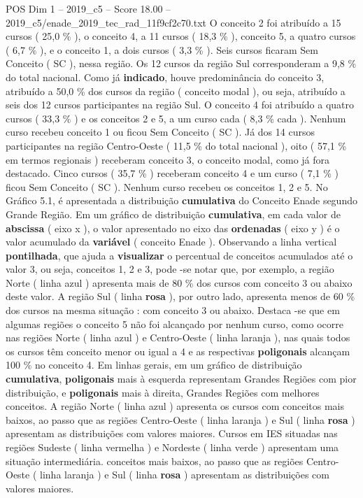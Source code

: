 \begin{textsample}{POS Dim 1 – 2019\_c5 – Score 18.00 – 2019\_c5/enade\_2019\_tec\_rad\_11f9cf2c70.txt}
O conceito 2 foi atribuído a 15 cursos ( 25,0 \% ), o conceito 4, a 11 cursos ( 18,3 \% ), conceito 5, a quatro cursos ( 6,7 \% ), e o conceito 1, a dois cursos ( 3,3 \% ).
Seis cursos ficaram Sem Conceito ( SC ), nessa região.
Os 12 cursos da região Sul corresponderam a 9,8 \% do total nacional.
Como já \textbf{indicado}, houve predominância do conceito 3, atribuído a 50,0 \% dos cursos da região ( conceito modal ), ou seja, atribuído a seis dos 12 cursos participantes na região Sul.
O conceito 4 foi atribuído a quatro cursos ( 33,3 \% ) e os conceitos 2 e 5, a um curso cada ( 8,3 \% cada ).
Nenhum curso recebeu conceito 1 ou ficou Sem Conceito ( SC ).
Já dos 14 cursos participantes na região Centro-Oeste ( 11,5 \% do total nacional ), oito ( 57,1 \% em termos regionais ) receberam conceito 3, o conceito modal, como já fora destacado.
Cinco cursos ( 35,7 \% ) receberam conceito 4 e um curso ( 7,1 \% ) ficou Sem Conceito ( SC ).
Nenhum curso recebeu os conceitos 1, 2 e 5.
No Gráfico 5.1, é apresentada a distribuição \textbf{cumulativa} do Conceito Enade segundo Grande Região.
Em um gráfico de distribuição \textbf{cumulativa}, em cada valor de \textbf{abscissa} ( eixo x ), o valor apresentado no eixo das \textbf{ordenadas} ( eixo y ) é o valor acumulado da \textbf{variável} ( conceito Enade ).
Observando a linha vertical \textbf{pontilhada}, que ajuda a \textbf{visualizar} o percentual de conceitos acumulados até o valor 3, ou seja, conceitos 1, 2 e 3, pode -se notar que, por exemplo, a região Norte ( linha azul ) apresenta mais de 80 \% dos cursos com conceito 3 ou abaixo deste valor.
A região Sul ( linha \textbf{rosa} ), por outro lado, apresenta menos de 60 \% dos cursos na mesma situação : com conceito 3 ou abaixo.
Destaca -se que em algumas regiões o conceito 5 não foi alcançado por nenhum curso, como ocorre nas regiões Norte ( linha azul ) e Centro-Oeste ( linha laranja ), nas quais todos os cursos têm conceito menor ou igual a 4 e as respectivas \textbf{poligonais} alcançam 100 \% no conceito 4.
Em linhas gerais, em um gráfico de distribuição \textbf{cumulativa}, \textbf{poligonais} mais à esquerda representam Grandes Regiões com pior distribuição, e \textbf{poligonais} mais à direita, Grandes Regiões com melhores conceitos.
A região Norte ( linha azul ) apresenta os cursos com conceitos mais baixos, ao passo que as regiões Centro-Oeste ( linha laranja ) e Sul ( linha \textbf{rosa} ) apresentam as distribuições com valores maiores.
Cursos em IES situadas nas regiões Sudeste ( linha vermelha ) e Nordeste ( linha verde ) apresentam uma situação intermediária. conceitos mais baixos, ao passo que as regiões Centro-Oeste ( linha laranja ) e Sul ( linha \textbf{rosa} ) apresentam as distribuições com valores maiores.

\end{textsample}
